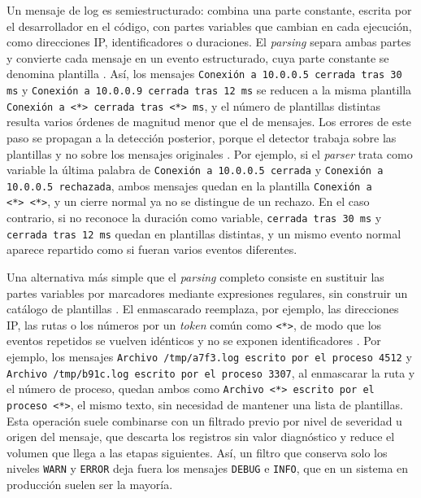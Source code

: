 Un mensaje de log es semiestructurado: combina una parte constante, escrita por el desarrollador en el código, con partes variables que cambian en cada ejecución, como direcciones IP, identificadores o duraciones. El \textit{parsing} separa ambas partes y convierte cada mensaje en un evento estructurado, cuya parte constante se denomina plantilla \cite{he2021_survey}. Así, los mensajes \texttt{Conexión a 10.0.0.5 cerrada tras 30 ms} y \texttt{Conexión a 10.0.0.9 cerrada tras 12 ms} se reducen a la misma plantilla \texttt{Conexión a <*>~cerrada tras <*>~ms}, y el número de plantillas distintas resulta varios órdenes de magnitud menor que el de mensajes. Los errores de este paso se propagan a la detección posterior, porque el detector trabaja sobre las plantillas y no sobre los mensajes originales \cite{sun2026_parsing}. Por ejemplo, si el \textit{parser} trata como variable la última palabra de \texttt{Conexión a 10.0.0.5 cerrada} y \texttt{Conexión a 10.0.0.5 rechazada}, ambos mensajes quedan en la plantilla \texttt{Conexión a <*>~<*>}, y un cierre normal ya no se distingue de un rechazo. En el caso contrario, si no reconoce la duración como variable, \texttt{cerrada tras 30 ms} y \texttt{cerrada tras 12 ms} quedan en plantillas distintas, y un mismo evento normal aparece repartido como si fueran varios eventos diferentes.

Una alternativa más simple que el \textit{parsing} completo consiste en sustituir las partes variables por marcadores mediante expresiones regulares, sin construir un catálogo de plantillas \cite{murphy2024_embeddings}. El enmascarado reemplaza, por ejemplo, las direcciones IP, las rutas o los números por un \textit{token} común como \texttt{<*>}, de modo que los eventos repetidos se vuelven idénticos y no se exponen identificadores \cite{guan2024_logllm}. Por ejemplo, los mensajes \texttt{Archivo /tmp/a7f3.log escrito por el proceso 4512} y \texttt{Archivo /tmp/b91c.log escrito por el proceso 3307}, al enmascarar la ruta y el número de proceso, quedan ambos como \texttt{Archivo <*>~escrito por el proceso <*>}, el mismo texto, sin necesidad de mantener una lista de plantillas. Esta operación suele combinarse con un filtrado previo por nivel de severidad u origen del mensaje, que descarta los registros sin valor diagnóstico y reduce el volumen que llega a las etapas siguientes. Así, un filtro que conserva solo los niveles \texttt{WARN} y \texttt{ERROR} deja fuera los mensajes \texttt{DEBUG} e \texttt{INFO}, que en un sistema en producción suelen ser la mayoría.

